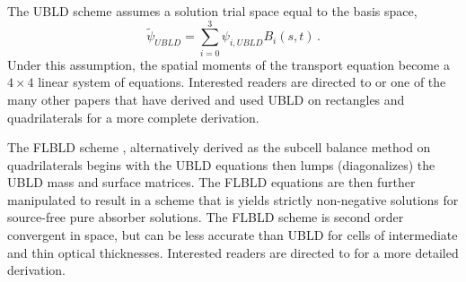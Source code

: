 \documentclass{mc2015}
\newcommand{\benum}{\begin{equation}} 			%
\newcommand{\eenum}{\end{equation}}
\newcommand{\beanum}{\begin{eqnarray}}  %
\newcommand{\eeanum}{\end{eqnarray}}
\newcommand{\eqts}[1]{Eqs. (\ref{#1})}  %
\newcommand{\B}[1]{\ensuremath{{B_{#1} }}}
\newcommand{\p}{\ensuremath{ \partial}}
\newcommand{\abs}[1]{\ensuremath{\left\lvert #1 \right\rvert}}
\newcommand{\omg}{\ensuremath{\vec{\Omega}}}
\newcommand{\pec}{\, ,}
\newcommand{\pep}{\, .}
\begin{document}

The UBLD scheme assumes a solution trial space equal to the basis space,
\benum
\widetilde{\psi}_{UBLD} = \sum_{i=0}^3{\psi_{i,UBLD} \B{i}(s,t)  } \pep
\eenum
Under this assumption, the spatial moments of the transport equation become a $4\times 4$ linear system of equations.  
Interested readers are directed to \cite{adams_dfem} or one of the many other papers that have derived and used UBLD on rectangles and quadrilaterals for a more complete derivation.

The FLBLD scheme \cite{flbld,adams_dfem}, alternatively derived as the subcell balance method on quadrilaterals \cite{adams_scb} begins with the UBLD equations then lumps (diagonalizes) the UBLD mass and surface matrices.  The FLBLD equations are then further manipulated to result in a scheme that is yields strictly non-negative solutions for source-free pure absorber solutions.  The FLBLD scheme is second order convergent in space, but can be less accurate than UBLD for cells of intermediate and thin optical thicknesses.  Interested readers are directed to \cite{flbld,adams_dfem,adams_scb} for a more detailed derivation.
\end{document}
